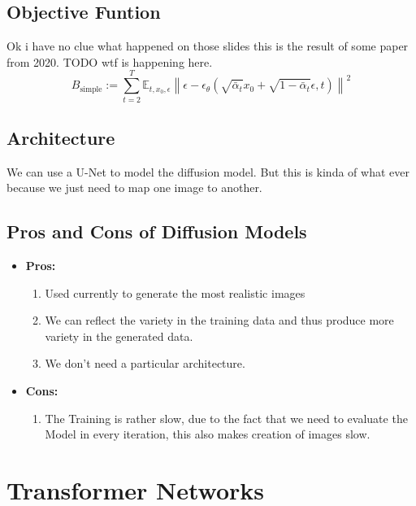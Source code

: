 \documentclass[a4paper]{article}
\begin{document}
\subsection{Objective Funtion}
Ok i have no clue what happened on those slides this is the result of some paper from 2020. TODO wtf is happening here.
\[
B_{\text{simple}} := \sum_{t=2}^{T} \mathbb{E}_{t, x_0, \epsilon} \left\| \epsilon - \epsilon_\theta \left( \sqrt{\bar{\alpha}_t} x_0 + \sqrt{1 - \bar{\alpha}_t} \epsilon, t \right) \right\|^2
\]
\subsection{Architecture}
We can use a U-Net to model the diffusion model. But this is kinda of what ever because we just need to map one image to another. 

\subsection{Pros and Cons of Diffusion Models}
\begin{itemize}
    \item \textbf{Pros:}
    \begin{enumerate}
        \item Used currently to generate the most realistic images
        \item We can reflect the variety in the training data and thus produce more variety in the generated data.
        \item We don't need a particular architecture. 
    \end{enumerate}
    \item \textbf{Cons:}
     \begin{enumerate}
        \item The Training is rather slow, due to the fact that we need to evaluate the Model in every iteration, this also makes creation of images slow. 
    \end{enumerate}
    \end{itemize}
\section{Transformer Networks}
\end{document}
